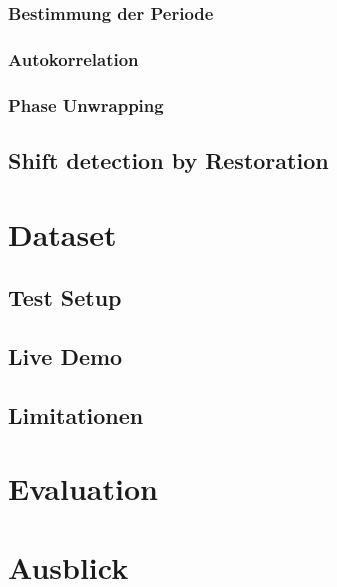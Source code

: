 \documentclass[10pt,a4paper]{scrreport}
\begin{document}
		\subsubsection{Bestimmung der Periode}
		
		\subsubsection{Autokorrelation}
		
		
		\subsubsection{Phase Unwrapping}

	\subsection{Shift detection by Restoration}

\section{Dataset}
	\subsection{Test Setup}
	\subsection{Live Demo}
	
	
\subsection{Limitationen}

\section{Evaluation}

\section{Ausblick}

\appendix
\end{document}
